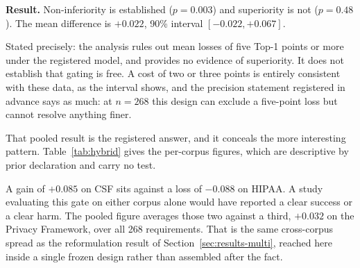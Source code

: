 \documentclass[smallextended,natbib]{svjour3}
\begin{document}
\noindent\textbf{Result.}
Non-inferiority is established ($p = 0.003$) and superiority is not ($p = 0.48$). The mean difference is $+0.022$, 90\% interval $[-0.022, +0.067]$.

Stated precisely: the analysis rules out mean losses of five Top-1 points or more under the registered model, and provides no evidence of superiority. It does not establish that gating is free. A cost of two or three points is entirely consistent with these data, as the interval shows, and the precision statement registered in advance says as much: at $n = 268$ this design can exclude a five-point loss but cannot resolve anything finer.

That pooled result is the registered answer, and it conceals the more interesting pattern. Table~\ref{tab:hybrid} gives the per-corpus figures, which are descriptive by prior declaration and carry no test.

\begin{table}[htbp]
\caption{Gated hybrid against the dual-encoder alone, Top-1. The pooled contrast is the registered primary result; per-corpus rows are descriptive by prior declaration.}
\label{tab:hybrid}
\centering
\setlength{\tabcolsep}{3pt}
\small
{}
\end{table}

A gain of $+0.085$ on CSF sits against a loss of $-0.088$ on HIPAA. A study evaluating this gate on either corpus alone would have reported a clear success or a clear harm. The pooled figure averages those two against a third, $+0.032$ on the Privacy Framework, over all 268 requirements. That is the same cross-corpus spread as the reformulation result of Section~\ref{sec:results-multi}, reached here inside a single frozen design rather than assembled after the fact.
\end{document}
